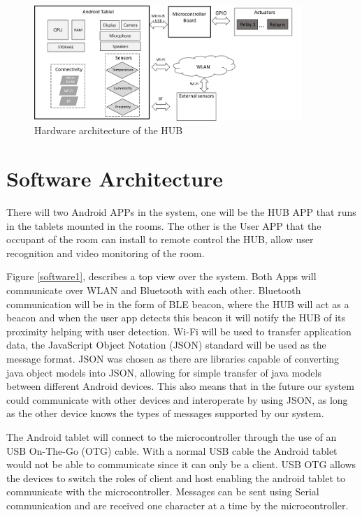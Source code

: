 \begin{figure}[h]
\centering
\includegraphics[width=0.9\textwidth]{Figures/hardware}
\caption{Hardware architecture of the HUB}
\label{architecture_system}
\end{figure}


\section{Software Architecture}\label{architecture4} 


There will two Android APPs in the system, one will be the HUB APP that runs in the tablets mounted in the rooms. The other is the User APP that the occupant of the room can install to remote control the HUB, allow user recognition and video monitoring of the room. 

Figure \ref{software1}, describes a top view over the system. Both Apps will communicate over WLAN and Bluetooth with each other. Bluetooth communication will be in the form of BLE beacon, where the HUB will act as a beacon and when the user app detects this beacon it will notify  the HUB of its proximity helping with user detection. Wi-Fi will be used to transfer application data, the JavaScript Object Notation (JSON) standard will be used as the message format. JSON was chosen as there are libraries capable of converting java object models into JSON, allowing for simple transfer of java models between different Android devices. This also means that in the future our system could communicate with other devices and interoperate by using JSON, as long as the other device knows the types of messages supported by our system.

The Android tablet will connect to the microcontroller through the use of an USB On-The-Go (OTG) cable. With a normal USB cable the Android tablet would not be able to communicate since it can only be a client. USB OTG allows the devices to switch the roles of client and host enabling the android tablet to communicate with the microcontroller. Messages can be sent using Serial communication and are received one character at a time by the microcontroller.


